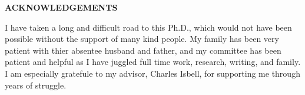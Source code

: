 \clearpage
\begin{centering}
\textbf{ACKNOWLEDGEMENTS}\\
\vspace{\baselineskip}
\end{centering}


I have taken a long and difficult road to this Ph.D., which would not have been possible without the support of many kind people. My family has been very patient with thier absentee husband and father, and my committee has been patient and helpful as I have juggled full time work, research, writing, and family. I am especially gratefule to my advisor, Charles Isbell, for supporting me through years of struggle.



\clearpage
